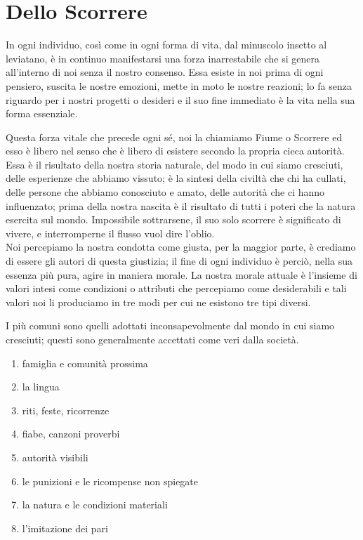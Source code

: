 \chapter{Dello Scorrere}

In ogni individuo, così come in ogni forma di vita, dal minuscolo insetto al leviatano, è in continuo manifestarsi una
forza inarrestabile che si genera all'interno di noi senza il nostro consenso. Essa esiste
in noi prima di ogni pensiero, suscita le nostre emozioni, mette in moto le nostre reazioni;
lo fa senza riguardo per i nostri progetti o desideri e il suo fine immediato è la vita nella sua forma essenziale.

Questa forza vitale che precede ogni sé, noi la chiamiamo Fiume o Scorrere ed esso è libero
nel senso che è libero di esistere secondo la propria cieca autorità. Essa è il risultato
della nostra storia naturale, del modo in cui siamo cresciuti, delle esperienze che abbiamo vissuto; è la sintesi
della civiltà che chi ha cullati, delle persone che abbiamo conosciuto e amato, delle autorità che ci hanno influenzato;
prima della nostra nascita è il risultato di tutti i poteri che la natura esercita sul mondo.
Impossibile sottrarsene, il suo solo scorrere è significato di vivere, e interromperne il flusso vuol dire l'oblio.\\

Noi percepiamo la nostra condotta come giusta, per la maggior parte, è crediamo di essere gli autori di questa giustizia;
il fine di ogni individuo è perciò, nella sua essenza più pura, agire in maniera morale. La nostra morale attuale è
l'insieme di valori intesi come condizioni o attributi che percepiamo come desiderabili e tali valori
noi li produciamo in tre modi per cui ne esistono tre tipi diversi.

I più comuni sono quelli adottati inconsapevolmente dal mondo in cui siamo cresciuti; questi sono generalmente accettati come veri dalla società.

\begin{enumerate}
	\item famiglia e comunità prossima
	\item la lingua
	\item riti, feste, ricorrenze
	\item fiabe, canzoni proverbi
	\item autorità visibili
	\item le punizioni e le ricompense non spiegate
	\item la natura e le condizioni materiali
	\item l'imitazione dei pari
\end{enumerate}

